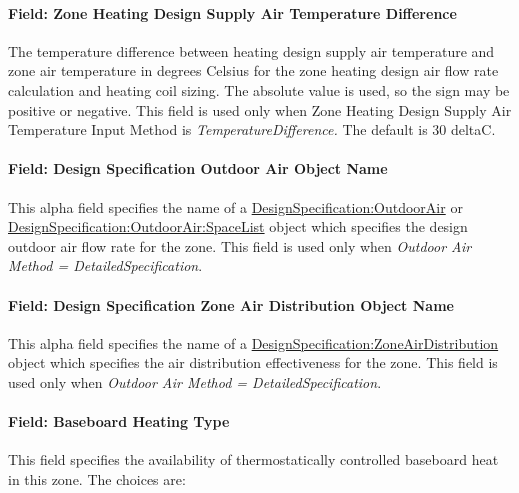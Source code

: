 \paragraph{Field: Zone Heating Design Supply Air Temperature Difference}\label{field-zone-heating-design-supply-air-temperature-difference-2}

The temperature difference between heating design supply air temperature and zone air temperature in degrees Celsius for the zone heating design air flow rate calculation and heating coil sizing. The absolute value is used, so the sign may be positive or negative. This field is used only when Zone Heating Design Supply Air Temperature Input Method is \emph{TemperatureDifference.} The default is 30 deltaC.

\paragraph{Field: Design Specification Outdoor Air Object Name}\label{field-design-specification-outdoor-air-object-name-4}

This alpha field specifies the name of a \hyperref[designspecificationoutdoorair]{DesignSpecification:OutdoorAir} or \hyperref[designspecificationoutdoorairspacelist]{DesignSpecification:OutdoorAir:SpaceList} object which specifies the design outdoor air flow rate for the zone. This field is used only when \emph{Outdoor Air Method = DetailedSpecification}.

\paragraph{Field: Design Specification Zone Air Distribution Object Name}\label{field-design-specification-zone-air-distribution-object-name-3}

This alpha field specifies the name of a \hyperref[designspecificationzoneairdistribution]{DesignSpecification:ZoneAirDistribution} object which specifies the air distribution effectiveness for the zone. This field is used only when \emph{Outdoor Air Method = DetailedSpecification}.

\paragraph{Field: Baseboard Heating Type}\label{field-baseboard-heating-type-3}

This field specifies the availability of thermostatically controlled baseboard heat in this zone. The choices are:

